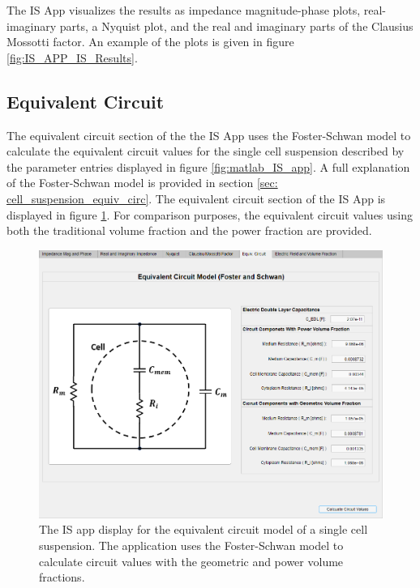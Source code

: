 \par The IS App visualizes the results as impedance magnitude-phase plots, real-imaginary parts, a Nyquist plot, and the real and imaginary parts of the Clausius Mossotti factor. An example of the plots is given in figure \ref{fig:IS_APP_IS_Results}.

\subsection*{Equivalent Circuit}
\par The equivalent circuit section of the the IS App uses the Foster-Schwan model to calculate the equivalent circuit values for the single cell suspension described by the parameter entries displayed in figure \ref{fig:matlab_IS_app}. A full explanation of the Foster-Schwan model is provided in section \ref{sec: cell_suspension_equiv_circ}. The equivalent circuit section of the IS App is displayed in figure \ref{fig:is_app_equivalent_circuit}. For comparison purposes, the equivalent circuit values using both the traditional volume fraction and the power fraction are provided.

\begin{figure}[h]
    \centering
    \includegraphics[width=\textwidth]{images/impedanceDisplayEquivCircuitV2.png}
    \caption[The IS app: Equivalent Circuit]{The IS app display for the equivalent circuit model of a single cell suspension. The application uses the Foster-Schwan model to calculate circuit values with the geometric and power volume fractions.}
    \label{fig:is_app_equivalent_circuit}
\end{figure}

